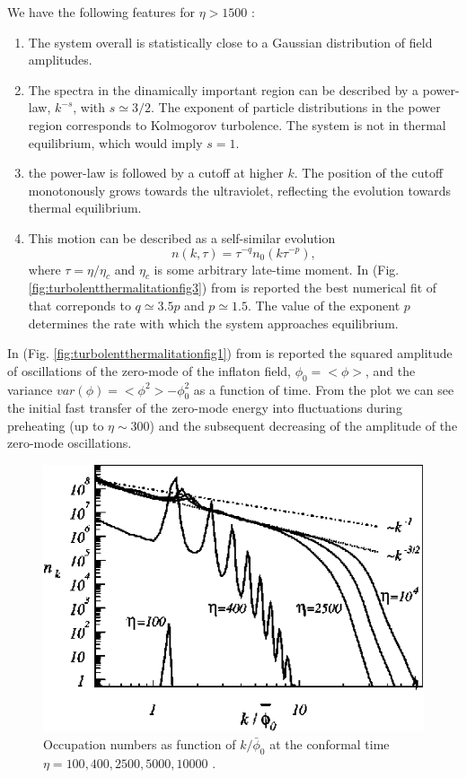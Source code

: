 \documentclass[11pt,a4paper,twoside]{book}
\begin{document}
We have the following features for $\eta > 1500$ \cite{Chap6:TurbolentThermalitation}:
\begin{enumerate}
	\item The system overall is statistically close to a Gaussian distribution of field amplitudes.\\
	
	\item The spectra in the dinamically important region can be described by a power-law, $ k^{-s} $, with $ s \simeq 3/2 $. The exponent of particle distributions in the power region corresponds to Kolmogorov turbolence. The system is not in thermal equilibrium, which would imply $ s=1 $.
	
	\item the power-law is followed by a cutoff at higher $ k $. The position of the cutoff monotonously grows towards the ultraviolet, reflecting the evolution towards thermal equilibrium.
	
	\item This motion can be described as a self-similar evolution
	\begin{equation}
	\label{Chap6:selfSimilarEvolution}
	n(k,\tau)=\tau^{-q}n_{0}(k\tau^{-p}),
	\end{equation}
where $ \tau = \eta/\eta_{c} $ and $ \eta_{c} $ is some arbitrary late-time moment. In (Fig. \ref{fig:turbolentthermalitationfig3}) from \cite{Chap6:TurbolentThermalitation} is reported the best numerical fit of \cite{Chap6:TurbolentThermalitation} that correponds to $ q \simeq 3.5p $ and $ p\simeq 1.5 $. The value of the exponent $ p $ determines the rate with which the system approaches equilibrium.
\end{enumerate}
In (Fig. \ref{fig:turbolentthermalitationfig1}) from \cite{Chap6:TurbolentThermalitation} is reported the squared amplitude of oscillations of the zero-mode of the inflaton field, $ \phi_{0}=<\phi> $, and the variance $ var(\phi)=<\phi^{2}> - \phi_{0}^{2} $ as a function of time. From the plot we can see the initial fast transfer of the zero-mode energy into fluctuations during  preheating (up to $\eta \sim 300$) and the subsequent decreasing of the amplitude of the zero-mode oscillations.\\
\begin{figure}
	\centering
	\includegraphics[width=0.55\linewidth, height=0.3\textheight]{Images/Chap6/TurbolentThermalitation_fig2}
	\caption{Occupation numbers as function of $ k/\bar{\phi}_{0} $ at the conformal time $ \eta=100, 400, 2500,  5000, 10000 $ \cite{Chap6:TurbolentThermalitation}.}
	\label{fig:turbolentthermalitationfig2}
\end{figure}
\end{document}
